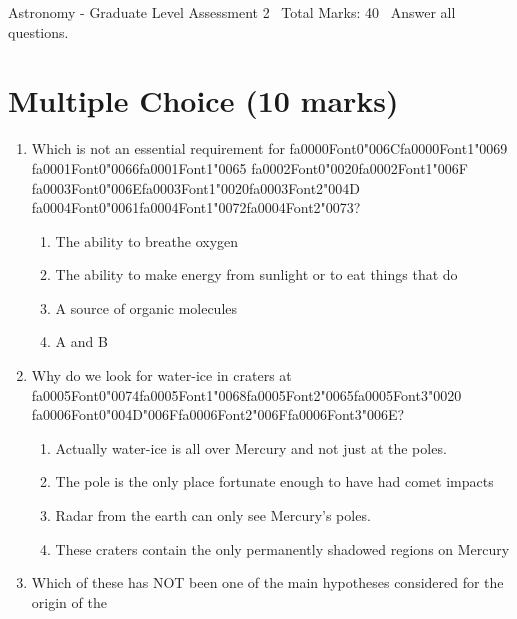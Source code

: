 \documentclass[12pt]{article}
\begin{document}
\begin{center}
Astronomy - Graduate Level Assessment 2 \
Total Marks: 40 \
Answer all questions.
\end{center}

\section*{Multiple Choice (10 marks)}
\begin{enumerate}[label=\arabic*.]
\item Which is not an essential requirement for {\csname fa0000Font0\endcsname\char"006C}{\csname fa0000Font1\endcsname\char"0069} {\csname fa0001Font0\endcsname\char"0066}{\csname fa0001Font1\endcsname\char"0065} {\csname fa0002Font0\endcsname\char"0020}{\csname fa0002Font1\endcsname\char"006F} {\csname fa0003Font0\endcsname\char"006E}{\csname fa0003Font1\endcsname\char"0020}{\csname fa0003Font2\endcsname\char"004D} {\csname fa0004Font0\endcsname\char"0061}{\csname fa0004Font1\endcsname\char"0072}{\csname fa0004Font2\endcsname\char"0073}?
\begin{enumerate}[label=(\alph*)]
    \item The ability to breathe oxygen
    \item The ability to make energy from sunlight or to eat things that do
    \item A source of organic molecules
    \item A and B
\end{enumerate}
\item Why do we look for water-ice in craters at {\csname fa0005Font0\endcsname\char"0074}{\csname fa0005Font1\endcsname\char"0068}{\csname fa0005Font2\endcsname\char"0065}{\csname fa0005Font3\endcsname\char"0020} {\csname fa0006Font0\endcsname\char"004D}{\char"006F}{\csname fa0006Font2\endcsname\char"006F}{\csname fa0006Font3\endcsname\char"006E}?
\begin{enumerate}[label=(\alph*)]
    \item Actually water-ice is all over Mercury and not just at the poles.
    \item The pole is the only place fortunate enough to have had comet impacts
    \item Radar from the earth can only see Mercury's poles.
    \item These craters contain the only permanently shadowed regions on Mercury
\end{enumerate}
\item Which of these has NOT been one of the main hypotheses considered for the origin of the

\end{enumerate}
\end{document}
